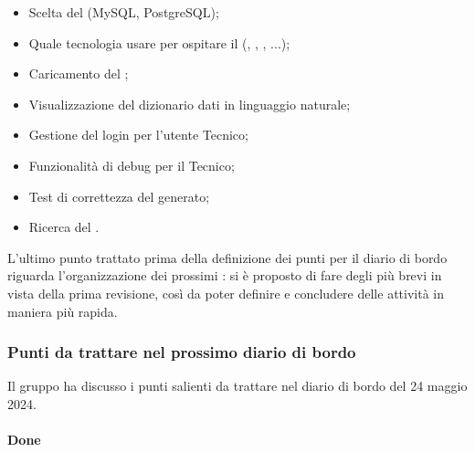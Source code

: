 \begin{itemize}
	\item Scelta del  (MySQL, PostgreSQL);
	\item Quale tecnologia usare per ospitare il  (, , , ...);
	\item Caricamento del ;
	\item Visualizzazione del dizionario dati in linguaggio naturale;
	\item Gestione del login per l'utente Tecnico; 
	\item Funzionalità di debug per il Tecnico;
	\item Test di correttezza del  generato;
	\item Ricerca del .
\end{itemize}
\par L'ultimo punto trattato prima della definizione dei punti per il diario di bordo riguarda l'organizzazione dei prossimi : si è proposto di fare degli  più brevi in vista della prima revisione, così da poter definire e concludere delle attività in maniera più rapida.

\subsubsection{Punti da trattare nel prossimo diario di bordo}
\par Il gruppo ha discusso i punti salienti da trattare nel diario di bordo del 24 maggio 2024.
\paragraph{Done}
